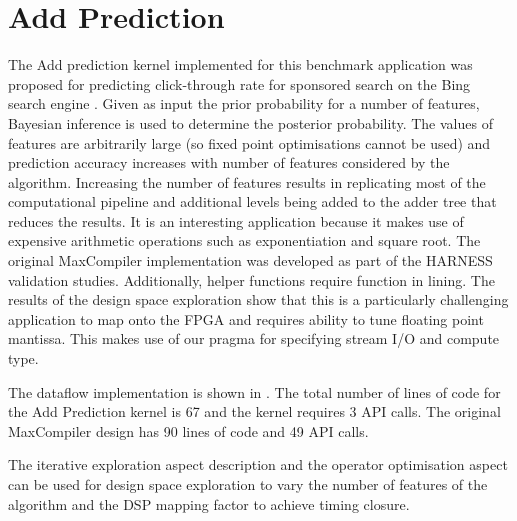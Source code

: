 \section{Add Prediction}

The Add prediction kernel implemented for this benchmark application
was proposed for predicting click-through rate for sponsored search on
the Bing search engine \cite{graepel2010web}. Given as input the prior
probability for a number of features, Bayesian inference is used to
determine the posterior probability. The values of features are
arbitrarily large (so fixed point optimisations cannot be used) and
prediction accuracy increases with number of features considered by
the algorithm. Increasing the number of features results in
replicating most of the computational pipeline and additional levels
being added to the adder tree that reduces the results. It is an
interesting application because it makes use of expensive arithmetic
operations such as exponentiation and square root. The original
MaxCompiler implementation was developed as part of the HARNESS
validation studies. Additionally, helper functions require function in
lining. The results of the design space exploration show that this is
a particularly challenging application to map onto the FPGA and
requires ability to tune floating point mantissa. This makes use of
our pragma for specifying stream I/O and compute type.

The \FAST{} dataflow implementation is shown in
.  The total number of lines of code for the
Add Prediction kernel is 67 and the kernel requires 3 API calls. The
original MaxCompiler design has 90 lines of code and 49 API calls.


The iterative exploration aspect description and the operator
optimisation aspect can be used for design space exploration to vary
the number of features of the algorithm and the DSP mapping factor to
achieve timing closure.


